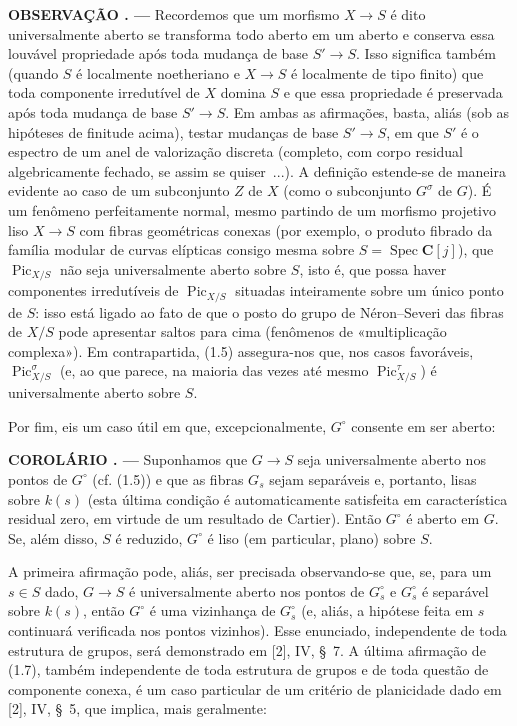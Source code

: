 \documentclass[11pt,twoside,openany]{book}
\numberwithin{equation}{section}
\newcommand{\src}[1]{%
  \phantomsection\hypertarget{src:#1}{}%
  \marginpar{\raggedleft\footnotesize\sffamily #1}%
}
\theoremstyle{plain}
\theoremstyle{definition}
\theoremstyle{remark}
\newcommand{\result}[2]{%
  \par\medskip\noindent\textbf{#1%
  \if\relax\detokenize{#2}\relax\else\space#2\fi. ---}\enspace
}
\newcommand{\FgaUnitKey}{frontmatter}
\renewcommand{\src}[1]{%
  \phantomsection\hypertarget{src:\FgaUnitKey:#1}{}%
  \marginpar{\raggedleft\footnotesize\sffamily #1}%
}
\begin{document}
\result{OBSERVAÇÃO}{1.6} Recordemos que um morfismo $X\longrightarrow S$ é
dito universalmente aberto se transforma todo aberto em um aberto e conserva
essa louvável propriedade após toda mudança de base $S'\longrightarrow S$.
Isso significa também (quando $S$ é localmente noetheriano e
$X\longrightarrow S$ é localmente de tipo finito) que toda componente
irredutível de $X$ domina $S$ e que essa propriedade é preservada após toda
mudança de base $S'\longrightarrow S$. Em ambas as afirmações, basta, aliás
(sob as hipóteses de finitude acima), testar mudanças de base
$S'\longrightarrow S$, em que $S'$ é o espectro de um anel de valorização
discreta (completo, com corpo residual algebricamente fechado, se assim se
quiser~...). A definição estende-se de maneira evidente ao caso de um
subconjunto $Z$ de $X$ (como o subconjunto $G^\sigma$ de $G$). É um fenômeno
perfeitamente normal, mesmo partindo de um morfismo projetivo liso
$X\longrightarrow S$ com fibras geométricas conexas (por exemplo, o produto
fibrado da família modular de curvas elípticas consigo mesma sobre
$S=\operatorname{Spec}\mathbf C[j]$), que $\operatorname{Pic}_{X/S}$ não
seja universalmente aberto sobre $S$, isto é, que possa haver componentes
irredutíveis de $\operatorname{Pic}_{X/S}$ situadas inteiramente sobre um
único ponto de $S$: isso está ligado ao fato de que o posto do grupo de
Néron--Severi das fibras de $X/S$ pode apresentar saltos para cima (fenômenos
de «multiplicação complexa»). Em contrapartida, (1.5) assegura-nos que, nos
casos favoráveis, $\operatorname{Pic}_{X/S}^\sigma$ (e, ao que parece, na
maioria das vezes até mesmo $\operatorname{Pic}_{X/S}^\tau$) é
universalmente aberto sobre $S$.
\src{229}
Por fim, eis um caso útil em que, excepcionalmente, $G^\circ$ consente em ser
aberto:

\result{COROLÁRIO}{1.7} Suponhamos que $G\longrightarrow S$ seja
universalmente aberto nos pontos de $G^\circ$ (cf. (1.5)) e que as fibras
$G_s$ sejam separáveis e, portanto, lisas sobre $k(s)$ (esta última condição é automaticamente satisfeita em
característica residual zero, em virtude de um resultado de Cartier). Então
$G^\circ$ é aberto em $G$. Se, além disso, $S$ é reduzido, $G^\circ$ é liso
(em particular, plano) sobre $S$.

A primeira afirmação pode, aliás, ser precisada observando-se que, se, para um
$s\in S$ dado, $G\longrightarrow S$ é universalmente aberto nos pontos de
$G_s^\circ$ e $G_s^\circ$ é separável sobre $k(s)$, então $G^\circ$ é uma
vizinhança de $G_s^\circ$ (e, aliás, a hipótese feita em $s$ continuará
verificada nos pontos vizinhos). Esse enunciado, independente de toda estrutura
de grupos, será demonstrado em [2], IV, §~7. A última afirmação de (1.7), também
independente de toda estrutura de grupos e de toda questão de componente
conexa, é um caso particular de um critério de planicidade dado em [2], IV, §~5,
que implica, mais geralmente:
\end{document}

